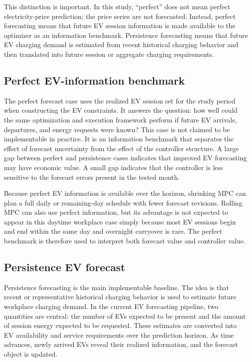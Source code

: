 \documentclass[final,5p,times]{elsarticle}
\begin{document}
This distinction is important. In this study, ``perfect'' does not mean perfect electricity-price prediction; the price series are not forecasted. Instead, perfect forecasting means that future EV session information is made available to the optimizer as an information benchmark. Persistence forecasting means that future EV charging demand is estimated from recent historical charging behavior and then translated into future session or aggregate charging requirements.

\subsection{Perfect EV-information benchmark}
The perfect forecast case uses the realized EV session set for the study period when constructing the EV constraints. It answers the question: how well could the same optimization and execution framework perform if future EV arrivals, departures, and energy requests were known? This case is not claimed to be implementable in practice. It is an information benchmark that separates the effect of forecast uncertainty from the effect of the controller structure. A large gap between perfect and persistence cases indicates that improved EV forecasting may have economic value. A small gap indicates that the controller is less sensitive to the forecast errors present in the tested month.

Because perfect EV information is available over the horizon, shrinking MPC can plan a full daily or remaining-day schedule with fewer forecast revisions. Rolling MPC can also use perfect information, but its advantage is not expected to appear in this daytime workplace case simply because most EV sessions begin and end within the same day and overnight carryover is rare. The perfect benchmark is therefore used to interpret both forecast value and controller value.

\subsection{Persistence EV forecast}
Persistence forecasting is the main implementable baseline. The idea is that recent or representative historical charging behavior is used to estimate future workplace charging demand. In the current EV forecasting pipeline, two quantities are central: the number of EVs expected to be present and the amount of session energy expected to be requested. These estimates are converted into EV availability and service requirements over the prediction horizon. As time advances, newly arrived EVs reveal their realized information, and the forecast object is updated.
\end{document}
